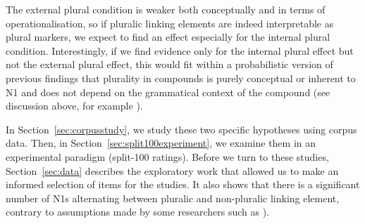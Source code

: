 The external plural condition is weaker both conceptually and in terms of operationalisation, so if pluralic linking elements are indeed interpretable as plural markers, we expect to find an effect especially for the internal plural condition.
Interestingly, if we find evidence only for the internal plural effect but not the external plural effect, this would fit within a probabilistic version of previous findings that plurality in compounds is purely conceptual or inherent to N1 and does not depend on the grammatical context of the compound (see discussion above, for example \citealt{Gallmann1998}).

In Section~\ref{sec:corpusstudy}, we study these two specific hypotheses using corpus data.
Then, in Section~\ref{sec:split100experiment}, we examine them in an experimental paradigm (split-100 ratings).
Before we turn to these studies, Section~\ref{sec:data} describes the exploratory work that allowed us to make an informed selection of items for the studies.
It also shows that there is a significant number of N1s alternating between pluralic and non-pluralic linking element, contrary to assumptions made by some researchers such as \citealt{NeefBorgwaldt2012,Neef2015}).
